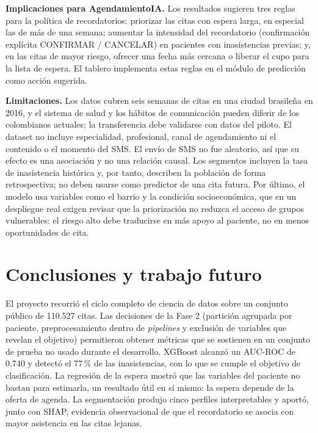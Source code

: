 \documentclass[11pt,letterpaper]{article}
\begin{document}
\textbf{Implicaciones para AgendamientoIA.} Los resultados sugieren tres reglas para la política de recordatorios: priorizar las citas con espera larga, en especial las de más de una semana; aumentar la intensidad del recordatorio (confirmación explícita CONFIRMAR / CANCELAR) en pacientes con inasistencias previas; y, en las citas de mayor riesgo, ofrecer una fecha más cercana o liberar el cupo para la lista de espera. El tablero implementa estas reglas en el módulo de predicción como acción sugerida.

\textbf{Limitaciones.} Los datos cubren seis semanas de citas en una ciudad brasileña en 2016, y el sistema de salud y los hábitos de comunicación pueden diferir de los colombianos actuales; la transferencia debe validarse con datos del piloto. El dataset no incluye especialidad, profesional, canal de agendamiento ni el contenido o el momento del SMS. El envío de SMS no fue aleatorio, así que su efecto es una asociación y no una relación causal. Los segmentos incluyen la tasa de inasistencia histórica y, por tanto, describen la población de forma retrospectiva; no deben usarse como predictor de una cita futura. Por último, el modelo usa variables como el barrio y la condición socioeconómica, que en un despliegue real exigen revisar que la priorización no reduzca el acceso de grupos vulnerables: el riesgo alto debe traducirse en más apoyo al paciente, no en menos oportunidades de cita.

\section{Conclusiones y trabajo futuro}

El proyecto recorrió el ciclo completo de ciencia de datos sobre un conjunto público de 110.527 citas. Las decisiones de la Fase 2 (partición agrupada por paciente, preprocesamiento dentro de \emph{pipelines} y exclusión de variables que revelan el objetivo) permitieron obtener métricas que se sostienen en un conjunto de prueba no usado durante el desarrollo. XGBoost alcanzó un AUC-ROC de 0,740 y detectó el 77\,\% de las inasistencias, con lo que se cumple el objetivo de clasificación. La regresión de la espera mostró que las variables del paciente no bastan para estimarla, un resultado útil en sí mismo: la espera depende de la oferta de agenda. La segmentación produjo cinco perfiles interpretables y aportó, junto con SHAP, evidencia observacional de que el recordatorio se asocia con mayor asistencia en las citas lejanas.
\end{document}
